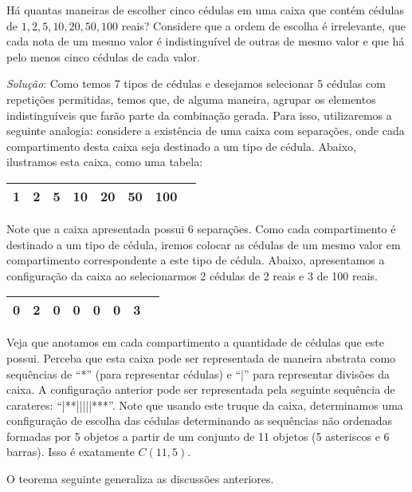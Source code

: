 \begin{Example}
Há quantas maneiras de escolher cinco cédulas em uma caixa que contém
cédulas de $1,2,5,10,20,50,100$ reais? Considere que a ordem de
escolha é irrelevante, que cada nota de um mesmo valor é
indistinguível de outras de mesmo valor e que há pelo menos cinco
cédulas de cada valor.

\textit{Solução}:
Como temos 7 tipos de cédulas e desejamos selecionar 5 cédulas com
repetições permitidas, temos que, de alguma maneira, agrupar os
elementos indistinguíveis que farão parte da combinação gerada. Para
isso, utilizaremos a seguinte analogia: considere a existência de uma
caixa com separações, onde cada compartimento desta caixa seja
destinado a um tipo de cédula. Abaixo, ilustramos esta caixa, como uma
tabela:

\begin{table}[h]
\begin{tabular}{|c|c|c|c|c|c|c|c|}
\hline
1 & 2 & 5 &10 & 20 & 50 & 100 \\ \hline
\end{tabular}
\centering
\end{table}

Note que a caixa apresentada possui 6 separações. Como cada
compartimento é destinado a um tipo de cédula, iremos colocar as
cédulas de um mesmo valor em compartimento correspondente a este tipo
de cédula. Abaixo, apresentamos a configuração da caixa ao
selecionarmos 2 cédulas de 2 reais e 3 de 100 reais.

\begin{table}[h]
\begin{tabular}{|c|c|c|c|c|c|c|c|}
\hline
0 & 2 & 0 & 0 & 0 & 0 & 3 \\ \hline
\end{tabular}
\centering
\end{table}

Veja que anotamos em cada compartimento a quantidade de cédulas que
este possui. Perceba que esta caixa pode ser representada de maneira
abstrata como sequências de ``*'' (para representar cédulas) e ``|''
para representar divisões da caixa. A configuração anterior pode ser
representada pela seguinte sequência de carateres:
``|**|||||***''. Note que usando este truque da caixa, determinamos
uma configuração de escolha das cédulas determinando as sequências não
ordenadas formadas por 5 objetos a partir de um conjunto de 11 objetos
(5 asteriscos e 6 barras). Isso é exatamente $C(11,5)$.
\end{Example}
O teorema seguinte generaliza as discussões anteriores.
